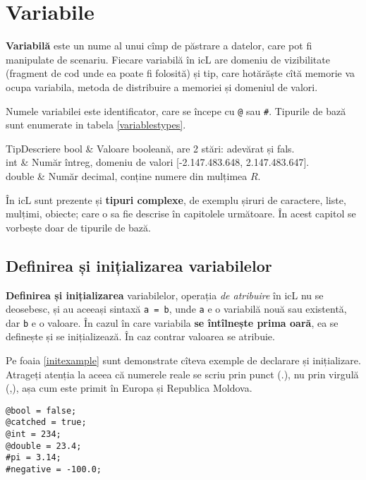 \section{Variabile}

\textbf{Variabilă} este un nume al unui cîmp de păstrare a datelor, care pot fi manipulate de scenariu. Fiecare variabilă în icL are domeniu de vizibilitate (fragment de cod unde ea poate fi folosită) și tip, care hotărăște cîtă memorie va ocupa variabila, metoda de distribuire a memoriei și domeniul de valori.

Numele variabilei este identificator, care se începe cu \lstinline|@| sau {\color{blue2}\lstinline|#|}. Tipurile de bază sunt enumerate in tabela \ref{variablestypes}.

%
{Tip}{Descriere}%
{
	bool   & Valoare booleană, are 2 stări: adevărat și fals. 				  \\ \hline
	int    & Număr întreg, domeniu de valori [-2.147.483.648, 2.147.483.647]. \\ \hline
	double & Număr decimal, conține numere din mulțimea $R$. 				  \\
}

În icL sunt prezente și \textbf{tipuri complexe}, de exemplu șiruri de caractere, liste, mulțimi, obiecte; care o sa fie descrise în capitolele următoare. În acest capitol se vorbește doar de tipurile de bază.

\subsection{Definirea și inițializarea variabilelor}

\textbf{Definirea și inițializarea} variabilelor, operația \textit{de atribuire} în icL nu se deosebesc, și au aceeași sintaxă \lstinline`a = b`, unde \lstinline`a` e o variabilă nouă sau existentă, dar \lstinline`b` e o valoare. În cazul în care variabila \textbf{se întîlnește prima oară}, ea se definește și se inițializează. În caz contrar valoarea se atribuie.

Pe foaia \ref{initexample} sunt demonstrate cîteva exemple de declarare și inițializare. Atrageți atenția la aceea că numerele reale se scriu prin punct (.), nu prin virgulă (,), așa cum este primit în Europa și Republica Moldova.

\begin{lstlisting}[caption=Exemplu de declarare și inițializare al variabilelor,label=initexample]
@bool = false;
@catched = true;
@int = 234;
@double = 23.4;
#pi = 3.14;
#negative = -100.0;
\end{lstlisting}

